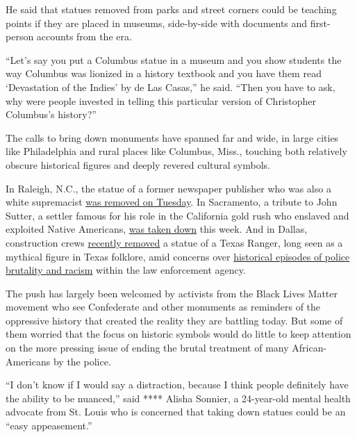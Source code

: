 He said that statues removed from parks and street corners could be
teaching points if they are placed in museums, side-by-side with
documents and first-person accounts from the era.

``Let's say you put a Columbus statue in a museum and you show students
the way Columbus was lionized in a history textbook and you have them
read `Devastation of the Indies' by de Las Casas,'' he said. ``Then you
have to ask, why were people invested in telling this particular version
of Christopher Columbus's history?''

The calls to bring down monuments have spanned far and wide, in large
cities like Philadelphia and rural places like Columbus, Miss., touching
both relatively obscure historical figures and deeply revered cultural
symbols.

In Raleigh, N.C., the statue of a former newspaper publisher who was
also a white supremacist
\href{https://www.newsobserver.com/news/local/article243559272.html?}{was
removed on Tuesday}. In Sacramento, a tribute to John Sutter, a settler
famous for his role in the California gold rush who enslaved and
exploited Native Americans,
\href{https://www.capradio.org/articles/2020/06/15/sutter-health-removes-john-sutter-statue-amid-complaints-about-racial-history/}{was
taken down} this week. And in Dallas, construction crews
\href{https://www.dallasnews.com/arts-entertainment/visual-arts/2020/06/03/the-statue-of-the-texas-ranger-at-love-field-may-be-coming-down/}{recently
removed} a statue of a Texas Ranger, long seen as a mythical figure in
Texas folklore, amid concerns over
\href{https://www.dallasnews.com/arts-entertainment/visual-arts/2020/06/03/the-statue-of-the-texas-ranger-at-love-field-may-be-coming-down/}{historical
episodes of police brutality and racism} within the law enforcement
agency.

The push has largely been welcomed by activists from the Black Lives
Matter movement who see Confederate and other monuments as reminders of
the oppressive history that created the reality they are battling today.
But some of them worried that the focus on historic symbols would do
little to keep attention on the more pressing issue of ending the brutal
treatment of many African-Americans by the police.

``I don't know if I would say a distraction, because I think people
definitely have the ability to be nuanced,'' said **** Alisha Sonnier, a
24-year-old mental health advocate from St. Louis who is concerned that
taking down statues could be an ``easy appeasement.''

